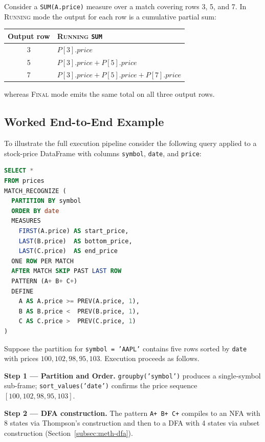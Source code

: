Consider a \texttt{SUM(A.price)} measure over a match covering
rows 3, 5, and 7.  In \textsc{Running} mode the output for each
row is a cumulative partial sum:
\begin{center}
\begin{tabular}{cl}
  Output row & \textsc{Running} \texttt{SUM} \\
  \hline
  3 & $P[3].\mathit{price}$ \\
  5 & $P[3].\mathit{price} + P[5].\mathit{price}$ \\
  7 & $P[3].\mathit{price} + P[5].\mathit{price} + P[7].\mathit{price}$ \\
\end{tabular}
\end{center}
whereas \textsc{Final} mode emits the same total on all three
output rows.

\subsection{Worked End-to-End Example}
\label{subsec:meth-exec-example}

To illustrate the full execution pipeline consider the following
query applied to a stock-price DataFrame with columns
\texttt{symbol}, \texttt{date}, and \texttt{price}:

\begin{lstlisting}[language=SQL, caption={Example query: detecting
  a V-shape price pattern}, label={lst:exec-example-query}]
SELECT *
FROM prices
MATCH_RECOGNIZE (
  PARTITION BY symbol
  ORDER BY date
  MEASURES
    FIRST(A.price) AS start_price,
    LAST(B.price)  AS bottom_price,
    LAST(C.price)  AS end_price
  ONE ROW PER MATCH
  AFTER MATCH SKIP PAST LAST ROW
  PATTERN (A+ B+ C+)
  DEFINE
    A AS A.price >= PREV(A.price, 1),
    B AS B.price <  PREV(B.price, 1),
    C AS C.price >  PREV(C.price, 1)
)
\end{lstlisting}

\noindent
Suppose the partition for \texttt{symbol = 'AAPL'} contains
five rows sorted by \texttt{date} with prices
$100, 102, 98, 95, 103$.  Execution proceeds as follows.

\vspace{0.5em}
\noindent
\textbf{Step 1 — Partition and Order.}
\texttt{groupby('symbol')} produces a single-symbol sub-frame;
\texttt{sort\_values('date')} confirms the price sequence
$[100, 102, 98, 95, 103]$.

\vspace{0.5em}
\noindent
\textbf{Step 2 — DFA construction.}
The pattern \texttt{A+ B+ C+} compiles to an NFA with 8 states via
Thompson's construction and then to a DFA with 4 states via subset
construction (Section~\ref{subsec:meth-dfa}).

